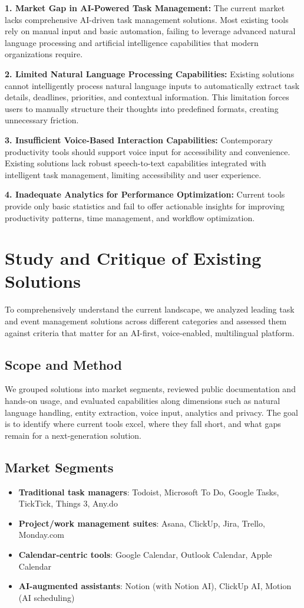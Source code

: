 \documentclass[12pt,a4paper]{article}
\begin{document}
\textbf{1. Market Gap in AI-Powered Task Management:}
The current market lacks comprehensive AI-driven task management solutions. Most existing tools rely on manual input and basic automation, failing to leverage advanced natural language processing and artificial intelligence capabilities that modern organizations require.

\textbf{2. Limited Natural Language Processing Capabilities:}
Existing solutions cannot intelligently process natural language inputs to automatically extract task details, deadlines, priorities, and contextual information. This limitation forces users to manually structure their thoughts into predefined formats, creating unnecessary friction.

\textbf{3. Insufficient Voice-Based Interaction Capabilities:}
Contemporary productivity tools should support voice input for accessibility and convenience. Existing solutions lack robust speech-to-text capabilities integrated with intelligent task management, limiting accessibility and user experience.

\textbf{4. Inadequate Analytics for Performance Optimization:}
Current tools provide only basic statistics and fail to offer actionable insights for improving productivity patterns, time management, and workflow optimization.

\section{Study and Critique of Existing Solutions}

To comprehensively understand the current landscape, we analyzed leading task and event management solutions across different categories and assessed them against criteria that matter for an AI-first, voice-enabled, multilingual platform.

\subsection{Scope and Method}
We grouped solutions into market segments, reviewed public documentation and hands-on usage, and evaluated capabilities along dimensions such as natural language handling, entity extraction, voice input, analytics and privacy. The goal is to identify where current tools excel, where they fall short, and what gaps remain for a next-generation solution.

\subsection{Market Segments}
\begin{itemize}
    \item \textbf{Traditional task managers}: Todoist, Microsoft To Do, Google Tasks, TickTick, Things 3, Any.do
    \item \textbf{Project/work management suites}: Asana, ClickUp, Jira, Trello, Monday.com
    \item \textbf{Calendar-centric tools}: Google Calendar, Outlook Calendar, Apple Calendar
    \item \textbf{AI-augmented assistants}: Notion (with Notion AI), ClickUp AI, Motion (AI scheduling)
\end{itemize}
\end{document}
